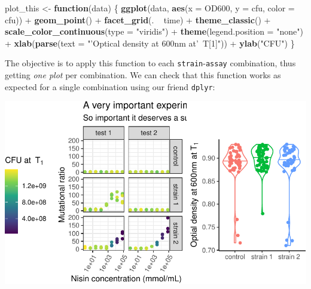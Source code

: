 \documentclass[]{book}
\newenvironment{Shaded}{}{}
\newcommand{\ControlFlowTok}[1]{\textcolor[rgb]{0.00,0.44,0.13}{\textbf{#1}}}
\newcommand{\DataTypeTok}[1]{\textcolor[rgb]{0.56,0.13,0.00}{#1}}
\newcommand{\KeywordTok}[1]{\textcolor[rgb]{0.00,0.44,0.13}{\textbf{#1}}}
\newcommand{\NormalTok}[1]{#1}
\newcommand{\OperatorTok}[1]{\textcolor[rgb]{0.40,0.40,0.40}{#1}}
\newcommand{\StringTok}[1]{\textcolor[rgb]{0.25,0.44,0.63}{#1}}
\begin{document}
\begin{Shaded}
\begin{Highlighting}[]
\NormalTok{plot_this <-}\StringTok{ }\ControlFlowTok{function}\NormalTok{(data) \{}
  \KeywordTok{ggplot}\NormalTok{(data, }\KeywordTok{aes}\NormalTok{(}\DataTypeTok{x =}\NormalTok{ OD600, }\DataTypeTok{y =}\NormalTok{ cfu, }\DataTypeTok{color =}\NormalTok{ cfu)) }\OperatorTok{+}
\StringTok{    }\KeywordTok{geom_point}\NormalTok{() }\OperatorTok{+}
\StringTok{    }\KeywordTok{facet_grid}\NormalTok{(. }\OperatorTok{~}\StringTok{ }\NormalTok{time) }\OperatorTok{+}
\StringTok{    }\KeywordTok{theme_classic}\NormalTok{() }\OperatorTok{+}
\StringTok{    }\KeywordTok{scale_color_continuous}\NormalTok{(}\DataTypeTok{type =} \StringTok{"viridis"}\NormalTok{) }\OperatorTok{+}
\StringTok{    }\KeywordTok{theme}\NormalTok{(}\DataTypeTok{legend.position =} \StringTok{"none"}\NormalTok{) }\OperatorTok{+}
\StringTok{    }\KeywordTok{xlab}\NormalTok{(}\KeywordTok{parse}\NormalTok{(}\DataTypeTok{text =} \StringTok{"'Optical density at 600nm at'~T[1]"}\NormalTok{)) }\OperatorTok{+}
\StringTok{    }\KeywordTok{ylab}\NormalTok{(}\StringTok{"CFU"}\NormalTok{)}
\NormalTok{\}}
\end{Highlighting}
\end{Shaded}

The objective is to apply this function to each \texttt{strain}-\texttt{assay} combination, thus getting \emph{one plot} per combination. We can check that this function works as expected for a single combination using our friend \texttt{dplyr}:

\begin{Shaded}
\end{Shaded}

\begin{center}\includegraphics[width=\textwidth]{TRES-Tidy-Tutorial_files/figure-latex/unnamed-chunk-151-1} \end{center}
\end{document}
